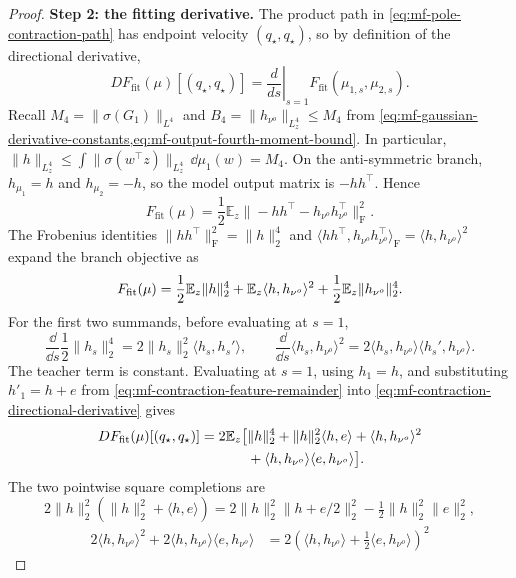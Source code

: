 \begin{proof}
\par\noindent\textbf{Step 2: the fitting derivative.}
The product path in \cref{eq:mf-pole-contraction-path} has endpoint velocity
\((q_\star,q_\star)\), so by definition of the directional derivative,
\begin{equation}
\label{eq:mf-contraction-directional-derivative}
 DF_{\mathrm{fit}}(\mu)[(q_\star,q_\star)]
 =\left.\frac d{ds}\right|_{s=1}
   F_{\mathrm{fit}}(\mu_{1,s},\mu_{2,s}).
\end{equation}
Recall \(M_4=\|\sigma(G_1)\|_{L^4}\) and
\(B_4=\|h_{\nu^o}\|_{L^4_z}\le M_4\) from
\cref{eq:mf-gaussian-derivative-constants,eq:mf-output-fourth-moment-bound}.
In particular,
\(\|h\|_{L^4_z}\le\int\|\sigma(w^\top z)\|_{L^4_z}\,\dd\mu_1(w)=M_4\).
On the anti-symmetric branch,
\(h_{\mu_1}=h\) and \(h_{\mu_2}=-h\), so the model output matrix is
\(-hh^\top\).  Hence
\[
 F_{\mathrm{fit}}(\mu)
 =\frac12\mathbb E_z
   \|-hh^\top-h_{\nu^o}h_{\nu^o}^\top\|_{\mathrm F}^2.
\]
The Frobenius identities
\(\|hh^\top\|_{\mathrm F}^2=\|h\|_2^4\) and
\(\langle hh^\top,h_{\nu^o}h_{\nu^o}^\top\rangle_{\mathrm F}
=\langle h,h_{\nu^o}\rangle^2\) expand the branch objective as
\begin{equation}
\label{eq:mf-branch-energy-expansion}
 F_{\mathrm{fit}}(\mu)
 =\frac12\mathbb{E}_z\|h\|_2^4
  +\mathbb{E}_z\langle h,h_{\nu^o}\rangle^2
  +\frac12\mathbb{E}_z\|h_{\nu^o}\|_2^4.
\end{equation}
For the first two summands, before evaluating at \(s=1\),
\[
 \frac{\dd}{\dd s}\frac12\|h_s\|_2^4
 =2\|h_s\|_2^2\langle h_s,h_s'\rangle,\qquad
 \frac{\dd}{\dd s}\langle h_s,h_{\nu^o}\rangle^2
 =2\langle h_s,h_{\nu^o}\rangle\langle h_s',h_{\nu^o}\rangle.
\]
The teacher term is constant.  Evaluating at \(s=1\), using \(h_1=h\),
and substituting \(h'_1=h+e\) from
\cref{eq:mf-contraction-feature-remainder} into
\cref{eq:mf-contraction-directional-derivative} gives
\begin{align}
 DF_{\mathrm{fit}}(\mu)[(q_\star,q_\star)]
 =2\mathbb{E}_z\bigl[&\|h\|_2^4+\|h\|_2^2\langle h,e\rangle
   +\langle h,h_{\nu^o}\rangle^2\notag\\
   &+\langle h,h_{\nu^o}\rangle\langle e,h_{\nu^o}\rangle\bigr].
\end{align}
The two pointwise square completions are
\[
 2\|h\|_2^2(\|h\|_2^2+\langle h,e\rangle)
 =2\|h\|_2^2\|h+e/2\|_2^2-\tfrac12\|h\|_2^2\|e\|_2^2,
\]
\[
\begin{aligned}
 2\langle h,h_{\nu^o}\rangle^2
 +2\langle h,h_{\nu^o}\rangle\langle e,h_{\nu^o}\rangle
 &=2(\langle h,h_{\nu^o}\rangle+\tfrac12\langle e,h_{\nu^o}\rangle)^2

\end{aligned}\]
\end{proof}
